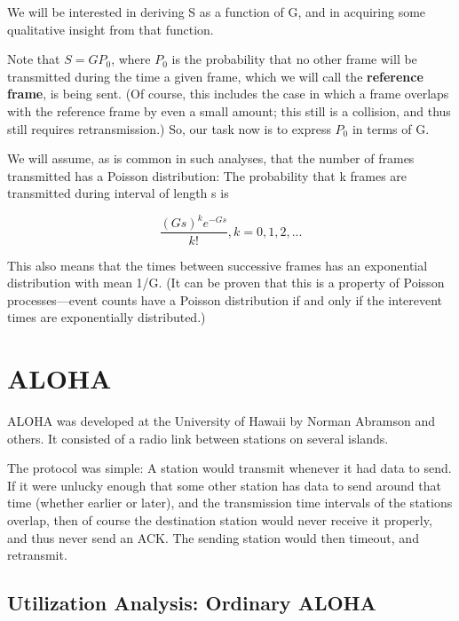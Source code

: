 \documentclass[11pt]{article}
\begin{document}
We will be interested in deriving S as a function of G, and in
acquiring some qualitative insight from that function.

Note that $S = G P_0$, where $P_0$ is the probability that no other
frame will be transmitted during the time a given frame, which we
will call the {\bf reference frame}, is being sent.  (Of course,
this includes the case in which a frame overlaps with the reference
frame by even a small amount; this still is a collision, and thus
still requires retransmission.)   So, our task now is to express
$P_0$ in terms of G.

We will assume, as is common in such analyses, that the number of
frames transmitted has a Poisson distribution:  The probability
that k frames are transmitted during interval of length s is

\begin{equation}
\frac{{(Gs)}^k e^{-Gs}}{k!}, k = 0,1,2,...
\end{equation}

This also means that the times between successive frames has an
exponential distribution with mean 1/G.  (It can be proven that this
is a property of Poisson processes---event counts have a Poisson
distribution if and only if the interevent times are exponentially
distributed.)

\section{ALOHA}

ALOHA was developed at the University of Hawaii by Norman Abramson and
others.  It consisted of a radio link between stations on several
islands.

The protocol was simple:  A station would transmit whenever it had data
to send.  If it were unlucky enough that some other station has data to
send around that time (whether earlier or later), and the transmission
time intervals of the stations overlap, then of course the destination
station would never receive it properly, and thus never send an ACK.
The sending station would then timeout, and retransmit.

\subsection{Utilization Analysis:  Ordinary ALOHA} 
\end{document}
